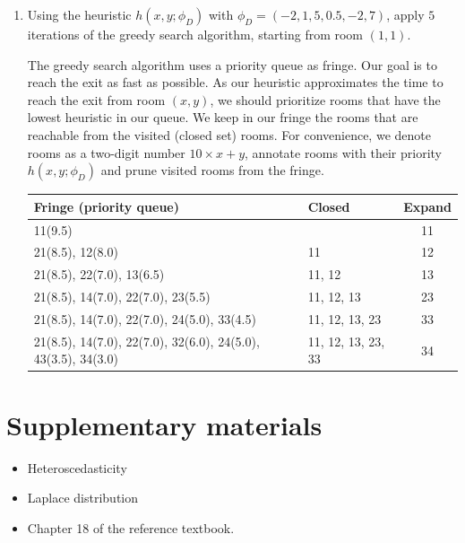 \documentclass[11pt, a4paper]{article}
\begin{document}
\begin{enumerate}
    \item Using the heuristic $h(x, y; \phi_D)$ with $\phi_D = (-2, 1, 5, 0.5, -2, 7)$, apply $5$ iterations of the greedy search algorithm, starting from room $(1, 1)$.

    \begin{solution}
        The greedy search algorithm uses a priority queue as fringe. Our goal is to reach the exit as fast as possible. As our heuristic approximates the time to reach the exit from room $(x, y)$, we should prioritize rooms that have the lowest heuristic in our queue. We keep in our fringe the rooms that are reachable from the visited (closed set) rooms. For convenience, we denote rooms as a two-digit number $10 \times x + y$, annotate rooms with their priority $h(x, y; \phi_D)$ and prune visited rooms from the fringe.

        \begin{table}[H]
            \centering
            \begin{tabular}{l|l|c}
                \toprule
                Fringe (priority queue) & Closed & Expand \\
                \midrule
                11(9.5) & & 11 \\
                21(8.5), 12(8.0) & 11 & 12 \\
                21(8.5), 22(7.0), 13(6.5) & 11, 12 & 13 \\
                21(8.5), 14(7.0), 22(7.0), 23(5.5) & 11, 12, 13 & 23 \\
                21(8.5), 14(7.0), 22(7.0), 24(5.0), 33(4.5) & 11, 12, 13, 23 & 33 \\
                21(8.5), 14(7.0), 22(7.0), 32(6.0), 24(5.0), 43(3.5), 34(3.0) & 11, 12, 13, 23, 33 & 34 \\
                \bottomrule
            \end{tabular}
        \end{table}
    \end{solution}
\end{enumerate}

\newpage

\section*{Supplementary materials}

\begin{itemize}
    \item Heteroscedasticity


    \item Laplace distribution


    \item Chapter 18 of the reference textbook.
\end{itemize}
\end{document}
